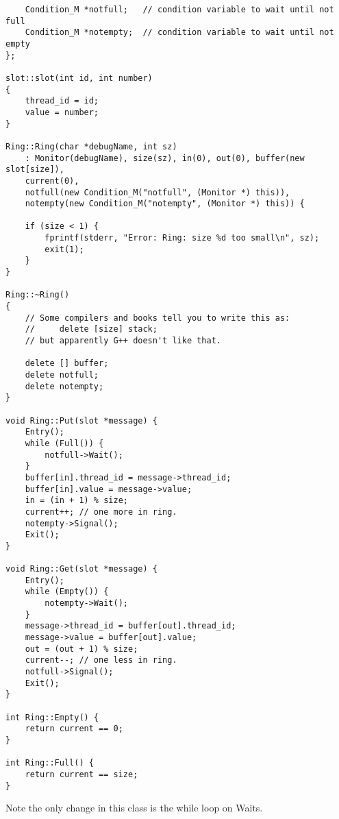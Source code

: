 \documentclass[11pt]{article}
\begin{document}
\begin{question}
\begin{verbatim}
    Condition_M *notfull;   // condition variable to wait until not full
    Condition_M *notempty;  // condition variable to wait until not empty
};

slot::slot(int id, int number)
{
    thread_id = id;
    value = number;
}

Ring::Ring(char *debugName, int sz)
    : Monitor(debugName), size(sz), in(0), out(0), buffer(new slot[size]),
    current(0),
    notfull(new Condition_M("notfull", (Monitor *) this)),
    notempty(new Condition_M("notempty", (Monitor *) this)) {

    if (size < 1) {
        fprintf(stderr, "Error: Ring: size %d too small\n", sz);
        exit(1);
    }
}

Ring::~Ring()
{
    // Some compilers and books tell you to write this as:
    //     delete [size] stack;
    // but apparently G++ doesn't like that.

    delete [] buffer;
    delete notfull;
    delete notempty;
}

void Ring::Put(slot *message) {
    Entry();
    while (Full()) {
        notfull->Wait();
    }
    buffer[in].thread_id = message->thread_id;
    buffer[in].value = message->value;
    in = (in + 1) % size;
    current++; // one more in ring.
    notempty->Signal();
    Exit();
}

void Ring::Get(slot *message) {
    Entry();
    while (Empty()) {
        notempty->Wait();
    }
    message->thread_id = buffer[out].thread_id;
    message->value = buffer[out].value;
    out = (out + 1) % size;
    current--; // one less in ring.
    notfull->Signal();
    Exit();
}

int Ring::Empty() {
    return current == 0;
}

int Ring::Full() {
    return current == size;
}
    \end{verbatim}

    Note the only change in this class is the while loop on Waits.

\end{question}
\end{document}

